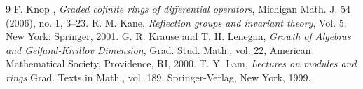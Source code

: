 \documentclass[12pt, a4paper]{amsart}
\begin{document}
\begin{thebibliography}{9}
 {\sc F. Knop }, {\em Graded cofinite rings of differential operators}, Michigan Math. J. 54 (2006), no. 1, 3–23.
 {\sc R. M. Kane},  {\em Reflection groups and invariant theory}, Vol. 5. New York: Springer, 2001.
{\sc G. R. Krause and T. H. Lenegan},
{\em Growth of Algebras and Gelfand-Kirillov Dimension},
Grad. Stud. Math., vol. 22, American Mathematical Society, Providence, RI, 2000.%
{\sc T. Y. Lam},
{\em Lectures on modules and rings}
Grad. Texts in Math., vol. 189, Springer-Verlag, New York, 1999.

\end{thebibliography}
\end{document}

